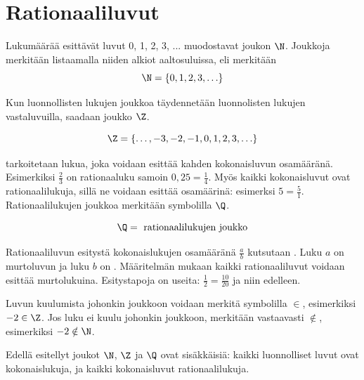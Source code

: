 \section{Rationaaliluvut}
    \label{rationaaliluvut}
    
Lukumäärää esittävät luvut 0, 1, 2, 3, ... muodostavat  joukon $\N$.
Joukkoja merkitään listaamalla niiden alkiot aaltosuluissa, eli merkitään
\[\N=\{0, 1, 2, 3, \ldots \} \]

Kun luonnollisten lukujen joukkoa täydennetään luonnolisten lukujen vastaluvuilla, saadaan  joukko $\Z$.

\[\Z=\{\ldots, -3, -2, -1, 0, 1, 2, 3, \ldots \} \]

 tarkoitetaan lukua, joka voidaan esittää kahden kokonaisluvun osamääränä. Esimerkiksi $\frac{2}{3}$ on rationaaluku samoin $0,25=\frac{1}{4}$. Myös kaikki kokonaisluvut ovat rationaalilukuja, sillä ne voidaan esittää osamäärinä: esimerksi $5=\frac{5}{1}$. Rationaalilukujen joukkoa
    merkitään symbolilla $\Q$.

\[\Q= \text{ rationaalilukujen joukko} \]    
    
     Rationaaliluvun esitystä kokonaislukujen osamääränä
    $\frac{a}{b}$ kutsutaan . Luku $a$ on murtoluvun
     ja luku $b$ on
    . Määritelmän mukaan kaikki rationaaliluvut
    voidaan esittää murtolukuina. Esitystapoja on useita: $\frac{1}{2}=\frac{10}{20}$ ja niin edelleen.

Luvun kuulumista johonkin joukkoon voidaan merkitä symbolilla $\in$,
esimerkiksi $-2 \in \Z$. Jos luku ei kuulu johonkin joukkoon, merkitään vastaavasti $\notin$, esimerkiksi $-2 \notin \N$.

Edellä esitellyt joukot $\N$, $\Z$ ja 
$\Q$ ovat sisäkkäisiä: kaikki luonnolliset luvut ovat kokonaislukuja, ja kaikki kokonaisluvut rationaalilukuja.

    
    
